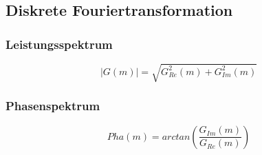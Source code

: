 \documentclass[10pt]{article}
\begin{document}
\subsection{Diskrete Fouriertransformation}
\begin{figure}[h]
	\begin{floatrow}
	\end{floatrow}
\end{figure}
\subsubsection*{Leistungsspektrum}
\begin{equation*}
	|G(m)| = \sqrt{G_{Re}^2(m) + G_{Im}^2(m)}
\end{equation*}
\subsubsection*{Phasenspektrum}
\begin{equation*}
	Pha(m) = arctan \left( \frac{G_{Im}(m)}{G_{Re}(m)} \right)
\end{equation*}
\end{document}
